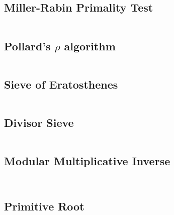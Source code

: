 \documentclass[8pt,a4paper,landscape,oneside]{amsart}
\newcommand{\code}[1]{\inputminted[fontsize=\normalsize,baselinestretch=1]{cpp}{_code/#1}}
\newif\ifverbose
\begin{document}
\begin{multicols*}{3}
    \subsection{Miller-Rabin Primality Test}
        \ifverbose
        The Miller-Rabin probabilistic primality test.
        \fi
        \code{mathematics/miller_rabin.cpp}

    \subsection{Pollard's $\rho$ algorithm}
        \code{mathematics/pollard_rho.cpp}

    \subsection{Sieve of Eratosthenes}
        \ifverbose
        An optimized implementation of Eratosthenes' Sieve.
        \fi
        \code{mathematics/prime_sieve.cpp}

    \subsection{Divisor Sieve}
        \ifverbose
        A O(n) prime sieve. Computes the smallest divisor of any number up to n.
        \fi
        \code{mathematics/divisor_sieve.cpp}

    \ifverbose
    \subsection{Modular Exponentiation}
        A function to perform fast modular exponentiation.
        \code{mathematics/mod_pow.cpp}
    \fi

    \subsection{Modular Multiplicative Inverse}
        \ifverbose
        A function to find a modular multiplicative inverse. Alternatively use
        \texttt{mod\_{}pow(a,m-2,m)} when $m$ is prime.
        \fi
        \code{mathematics/mod_inv.cpp}
        \ifverbose
        A sieve version:
        \fi
        \code{mathematics/mod_inv_sieve.cpp}

    \subsection{Primitive Root}
        \code{mathematics/primitive_root.cpp}


\end{multicols*}
\end{document}
